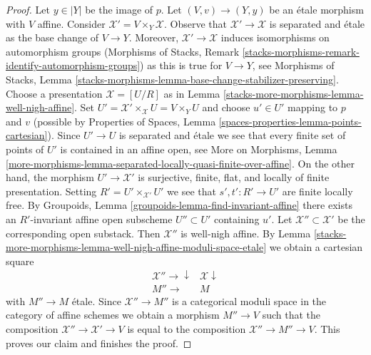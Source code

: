 \begin{proof}
\medskip\noindent
Let $y \in |Y|$ be the image of $p$.
Let $(V, v) \to (Y, y)$ be an \'etale morphism with $V$ affine.
Consider $\mathcal{X}' = V \times_Y \mathcal{X}$.
Observe that $\mathcal{X}' \to \mathcal{X}$ is separated and \'etale
as the base change of $V \to Y$. Moreover, $\mathcal{X}' \to \mathcal{X}$
induces isomorphisms on automorphism groups
(Morphisms of Stacks, Remark
\ref{stacks-morphisms-remark-identify-automorphism-groups})
as this is true for
$V \to Y$, see Morphisms of Stacks, Lemma
\ref{stacks-morphisms-lemma-base-change-stabilizer-preserving}.
Choose a presentation $\mathcal{X} = [U/R]$
as in Lemma \ref{stacks-more-morphisms-lemma-well-nigh-affine}.
Set $U' = \mathcal{X}' \times_\mathcal{X} U = V \times_Y U$
and choose $u' \in U'$ mapping to $p$ and $v$ (possible
by Properties of Spaces, Lemma \ref{spaces-properties-lemma-points-cartesian}).
Since $U' \to U$ is separated and \'etale we see that
every finite set of points of $U'$ is contained in an affine open, see
More on Morphisms, Lemma
\ref{more-morphisms-lemma-separated-locally-quasi-finite-over-affine}.
On the other hand, the morphism $U' \to \mathcal{X}'$ is
surjective, finite, flat, and locally of finite presentation.
Setting $R' = U' \times_{\mathcal{X}'} U'$ we see
that $s', t' : R' \to U'$ are finite locally free.
By Groupoids, Lemma \ref{groupoids-lemma-find-invariant-affine}
there exists an $R'$-invariant affine open subscheme $U'' \subset U'$
containing $u'$.
Let $\mathcal{X}'' \subset \mathcal{X}'$ be
the corresponding open substack. Then $\mathcal{X}''$ is
well-nigh affine. By Lemma \ref{stacks-more-morphisms-lemma-well-nigh-affine-moduli-space-etale}
we obtain a cartesian square
$$
\begin{array}{cc}\mathcal{X}'' \longrightarrow\downarrow & \mathcal{X} \downarrow \\ M'' \longrightarrow & M\end{array}
$$
with $M'' \to M$ \'etale. Since $\mathcal{X}'' \to M''$ is
a categorical moduli space in the category of affine schemes
we obtain a morphism $M'' \to V$ such that the composition
$\mathcal{X}'' \to \mathcal{X}' \to V$ is equal to the composition
$\mathcal{X}'' \to M'' \to V$. This proves our claim and finishes
the proof.
\end{proof}

